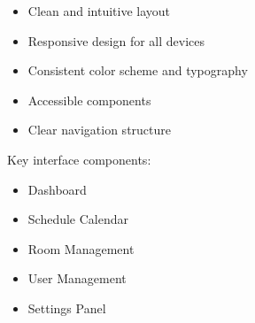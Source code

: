 \documentclass[12pt,a4paper]{report}
\begin{document}
\begin{itemize}
    \item Clean and intuitive layout
    \item Responsive design for all devices
    \item Consistent color scheme and typography
    \item Accessible components
    \item Clear navigation structure
\end{itemize}

Key interface components:
\begin{itemize}
    \item Dashboard
    \item Schedule Calendar
    \item Room Management
    \item User Management
    \item Settings Panel
\end{itemize}
\end{document}
